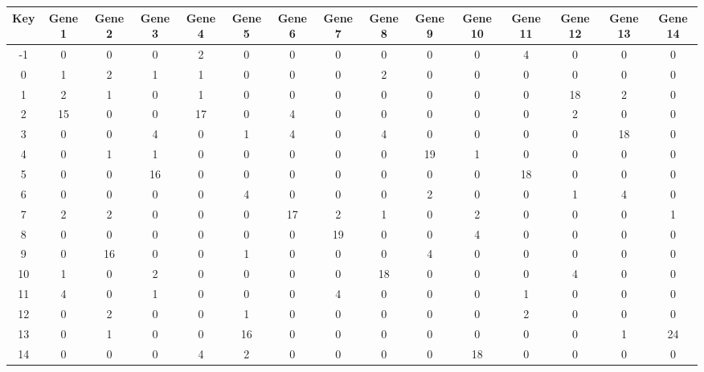 \begin{tabular}{|c|c|c|c|c|c|c|c|c|c|c|c|c|c|c|}
\hline
Key & Gene 1 & Gene 2 & Gene 3 & Gene 4 & Gene 5 & Gene 6 & Gene 7 & Gene 8 & Gene 9 & Gene 10 & Gene 11 & Gene 12 & Gene 13 & Gene 14 \\
\hline
-1 & 0 & 0 & 0 & 2 & 0 & 0 & 0 & 0 & 0 & 0 & 4 & 0 & 0 & 0 \\
0 & 1 & 2 & 1 & 1 & 0 & 0 & 0 & 2 & 0 & 0 & 0 & 0 & 0 & 0 \\
1 & 2 & 1 & 0 & 1 & 0 & 0 & 0 & 0 & 0 & 0 & 0 & 18 & 2 & 0 \\
2 & 15 & 0 & 0 & 17 & 0 & 4 & 0 & 0 & 0 & 0 & 0 & 2 & 0 & 0 \\
3 & 0 & 0 & 4 & 0 & 1 & 4 & 0 & 4 & 0 & 0 & 0 & 0 & 18 & 0 \\
4 & 0 & 1 & 1 & 0 & 0 & 0 & 0 & 0 & 19 & 1 & 0 & 0 & 0 & 0 \\
5 & 0 & 0 & 16 & 0 & 0 & 0 & 0 & 0 & 0 & 0 & 18 & 0 & 0 & 0 \\
6 & 0 & 0 & 0 & 0 & 4 & 0 & 0 & 0 & 2 & 0 & 0 & 1 & 4 & 0 \\
7 & 2 & 2 & 0 & 0 & 0 & 17 & 2 & 1 & 0 & 2 & 0 & 0 & 0 & 1 \\
8 & 0 & 0 & 0 & 0 & 0 & 0 & 19 & 0 & 0 & 4 & 0 & 0 & 0 & 0 \\
9 & 0 & 16 & 0 & 0 & 1 & 0 & 0 & 0 & 4 & 0 & 0 & 0 & 0 & 0 \\
10 & 1 & 0 & 2 & 0 & 0 & 0 & 0 & 18 & 0 & 0 & 0 & 4 & 0 & 0 \\
11 & 4 & 0 & 1 & 0 & 0 & 0 & 4 & 0 & 0 & 0 & 1 & 0 & 0 & 0 \\
12 & 0 & 2 & 0 & 0 & 1 & 0 & 0 & 0 & 0 & 0 & 2 & 0 & 0 & 0 \\
13 & 0 & 1 & 0 & 0 & 16 & 0 & 0 & 0 & 0 & 0 & 0 & 0 & 1 & 24 \\
14 & 0 & 0 & 0 & 4 & 2 & 0 & 0 & 0 & 0 & 18 & 0 & 0 & 0 & 0 \\
\hline
\end{tabular}